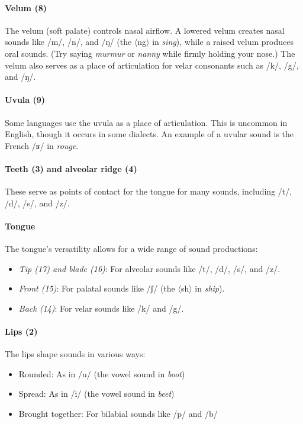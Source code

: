 \paragraph*{Velum (8)} The velum (soft palate) controls nasal airflow. A lowered velum creates nasal sounds like /m/, /n/, and /ŋ/ (the $\langle$ng$\rangle$ in \textit{sing}), while a raised velum produces oral sounds. (Try saying \textit{murmur} or \textit{nanny} while firmly holding your nose.) The velum also serves as a place of articulation for velar consonants such as /k/, /g/, and /ŋ/.

\paragraph*{Uvula (9)} Some languages use the uvula as a place of articulation. This is uncommon in English, though it occurs in some dialects. An example of a uvular sound is the French /ʁ/ in \textit{rouge}.


\paragraph*{Teeth (3) and alveolar ridge (4)} These serve as points of contact for the tongue for many sounds, including /t/, /d/, /s/, and /z/.

\paragraph*{Tongue} The tongue's versatility allows for a wide range of sound productions:
\begin{itemize}[noitemsep]
    \item \textit{Tip (17) and blade (16)}: For alveolar sounds like /t/, /d/, /s/, and /z/.
    \item \textit{Front (15)}: For palatal sounds like /ʃ/ (the $\langle$sh$\rangle$ in \textit{ship}).
    \item \textit{Back (14)}: For velar sounds like /k/ and /g/.
\end{itemize}

\paragraph*{Lips (2)} The lips shape sounds in various ways:
\begin{itemize}[noitemsep]
    \item Rounded: As in /u/ (the vowel sound in \textit{boot})
    \item Spread: As in /i/ (the vowel sound in \textit{beet})
    \item Brought together: For bilabial sounds like /p/ and /b/
\end{itemize}

